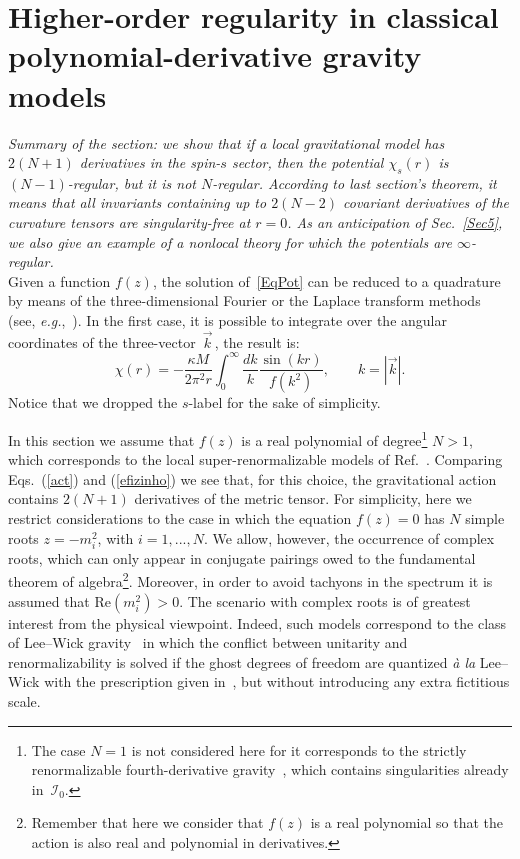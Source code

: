 \documentclass[aps,prd,a4paper,twocolumn,showpacs,showkeys,preprintnumbers,amsmath,amssymb,nofootinbib]{revtex4-2}
\renewcommand{\thesection}{\arabic{section}}
\numberwithin{equation}{section}
\let\oldsection\section%
\renewcommand{\section}{%
  \renewcommand{\theequation}{\thesection.\arabic{equation}}%
  \oldsection}%
\def\beq{\begin{equation}}
\def\eeq{\end{equation}}
\newcommand{\eq}[1]{(\ref{#1})}
\def\ka{\kappa}
\begin{document}


\section{Higher-order regularity in classical polynomial-derivative gravity models}
\label{class-ex} 
\label{Sec4}

{\it 
Summary of the section: we show that if a local gravitational model has $2(N+1)$ derivatives in the spin-$s$ sector, then the potential $\chi_s(r)$ is $(N-1)$-regular, but it is not $N$-regular.
According to last section's theorem, it means that all invariants containing up to $2(N-2)$ covariant derivatives of the curvature tensors are singularity-free at $r = 0$.
As an anticipation of Sec.~\ref{Sec5}, we also give an example of a nonlocal theory for which the potentials are $\infty$-regular.
}\\

Given a function $f(z)$, the solution of~\eqref{EqPot} can be reduced to a quadrature by means of the three-dimensional Fourier or the Laplace transform methods (see, \textit{e.g.},~\cite{Newton-MNS,Newton-BLG,BreTib1,Frolov:Exp,Frolov:Poly,Buoninfante:2020qud}). In the first case, it is possible to integrate over the angular coordinates of the three-vector $\, \vec{ k} \,$, the result is:
%
\beq \label{Chi-Int}
\chi (r) = - \frac{\ka M}{ 2\pi^2 r} \int_0^\infty \frac{dk}{k} 
\frac{\sin (kr)}{f({ k}^2)} 
, \qquad k = | \vec{ k} |.
\eeq
Notice that we dropped the $s$-label for the sake of simplicity.


In this section we assume that $f(z)$ is a real polynomial of degree\footnote{The case $N=1$ is not considered here for it corresponds to the strictly renormalizable fourth-derivative gravity~\cite{Stelle77}, which contains singularities already in~$\mathscr{I}_{0}$.} $N>1$, which corresponds to the local super-renormalizable models of Ref.~\cite{AsoreyLopezShapiro}.
Comparing Eqs.~\eq{act} and \eq{efizinho} we see that, for this choice, the gravitational action contains $2(N+1)$ derivatives of the metric tensor. For simplicity, here we restrict considerations to the case in which the equation $f(z)=0$ has $N$ simple roots $z=-m_i^2$, with $i=1,...,N$. We allow, however, the occurrence of complex roots,  which can only appear in conjugate pairings owed to the fundamental theorem of algebra\footnote{Remember that here we consider that $f(z)$ is a real polynomial so that the action is also real and polynomial in derivatives.}. Moreover, in order to avoid tachyons in the spectrum it is assumed that $\text{Re} (m_i^2) > 0$.
The scenario with complex roots is of greatest interest from the physical viewpoint. Indeed, such models correspond to the class of Lee--Wick gravity~\cite{ModestoShapiro16,Modesto16} in which the conflict between unitarity and renormalizability is solved if the ghost degrees of freedom are quantized {\it \`a la} Lee--Wick with the prescription given in~\cite{AnselmiPiva1,AnselmiPiva2}, but without introducing any extra fictitious scale.
\end{document}
